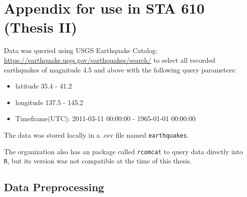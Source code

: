 
\section{Appendix for use in STA 610 (Thesis
II)}\label{appendix-for-use-in-sta-610-thesis-ii}

Data was queried using USGS Earthquake Catalog:
\url{https://earthquake.usgs.gov/earthquakes/search/} to select all
recorded earthquakes of magnitude 4.5 and above with the following query
parameters:

\begin{itemize}
\tightlist
\item
  latitude 35.4 - 41.2
\item
  longitude 137.5 - 145.2
\item
  Timeframe(UTC): 2011-03-11 00:00:00 - 1965-01-01 00:00:00
\end{itemize}

The data was stored locally in a .csv file named \texttt{earthquakes}.

The organization also has an package called \texttt{rcomcat} to query
data directly into \texttt{R}, but its version was not compatible at the
time of this thesis.

\hypertarget{data-preprocessing}{%
\subsection{Data Preprocessing}\label{data-preprocessing}}

